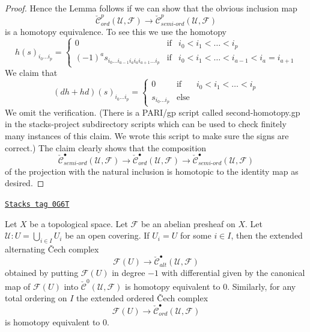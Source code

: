 \begin{proof}
\medskip\noindent
Hence the Lemma follows if we can show that the obvious inclusion map
$$
\check{\mathcal{C}}_{ord}^p(\mathcal{U}, \mathcal{F})
\longrightarrow
\check{\mathcal{C}}_{semi\text{-}ord}^p(\mathcal{U}, \mathcal{F})
$$
is a homotopy equivalence. To see this we use the homotopy
\begin{equation}
\label{equation-second-homotopy}
h(s)_{i_0 \ldots i_p} =
\left\{
\begin{matrix}
0 & \text{if} & i_0 < i_1 < \ldots < i_p \\
(-1)^a s_{i_0 \ldots i_{a - 1} i_a i_a i_{a + 1} \ldots i_p}
& \text{if} & i_0 < i_1 < \ldots < i_{a - 1} < i_a = i_{a + 1}
\end{matrix}
\right.
\end{equation}
We claim that
$$
(dh + hd)(s)_{i_0 \ldots i_p} =
\left\{
\begin{matrix}
0 & \text{if} & i_0 < i_1 < \ldots < i_p \\
s_{i_0 \ldots i_p}
& \text{else} &
\end{matrix}
\right.
$$
We omit the verification. (There is a PARI/gp script called second-homotopy.gp
in the stacks-project subdirectory scripts which can be used to check
finitely many instances of this claim.
We wrote this script to make sure the signs are correct.)
The claim clearly shows that the composition
$$
\check{\mathcal{C}}_{semi\text{-}ord}^\bullet(\mathcal{U}, \mathcal{F})
\longrightarrow
\check{\mathcal{C}}_{ord}^\bullet(\mathcal{U}, \mathcal{F})
\longrightarrow
\check{\mathcal{C}}_{semi\text{-}ord}^\bullet(\mathcal{U}, \mathcal{F})
$$
of the projection with the natural inclusion
is homotopic to the identity map as desired.
\end{proof}

\begin{lemma}
\label{cohomology-lemma-alternating-cech-trivial}
\href{https://stacks.math.columbia.edu/tag/0G6T}{\texttt{Stacks tag 0G6T}}

Let $X$ be a topological space. Let $\mathcal{F}$ be an abelian presheaf on $X$.
Let $\mathcal{U} : U = \bigcup_{i \in I} U_i$ be an open covering. If
$U_i = U$ for some $i \in I$, then the extended alternating {\v C}ech complex
$$
\mathcal{F}(U) \to \check{\mathcal{C}}_{alt}^\bullet(\mathcal{U}, \mathcal{F})
$$
obtained by putting $\mathcal{F}(U)$ in degree $-1$ with differential given by
the canonical map of $\mathcal{F}(U)$ into
$\check{\mathcal{C}}^0(\mathcal{U}, \mathcal{F})$
is homotopy equivalent to $0$. Similarly, for any total ordering on $I$
the extended ordered {\v C}ech complex
$$
\mathcal{F}(U) \to
\check{\mathcal{C}}_{ord}^\bullet(\mathcal{U}, \mathcal{F})
$$
is homotopy equivalent to $0$.
\end{lemma}

